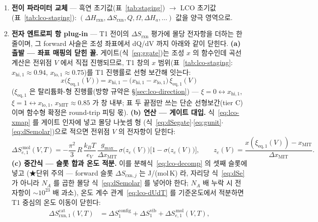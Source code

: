 \documentclass[11pt,a4paper]{article}
\newcommand{\eq}{\mathrm{eq}}
\newcommand{\rxn}{\mathrm{rxn}}
\begin{document}
\begin{enumerate}[label=(\roman*),leftmargin=2.2em,itemsep=1pt]
\item \textbf{전이 파라미터 교체} — 흑연 초기값(표~\ref{tab:staging}) $\to$ LCO 초기값(표~\ref{tab:lco-staging}):
$(\Delta H_\rxn,\Delta S_\rxn,Q,\Omega,\Delta H_a,\dots)$ 값을 양극 영역으로.
\item \textbf{전자 엔트로피 항 plug-in} — T1 전이의 $\Delta S_{\rxn}$ 평가에 몰당 전자항을 더하는 한 줄이며,
그 forward 사슬은 조성 좌표에서 dQ/dV 까지 아래와 같이 닫힌다.
\textbf{(a) 출발 — 좌표 매핑의 닫힌 꼴.} 게이트(식~\eqref{eq:ggate})는 조성 $x$ 의 함수인데 곡선 계산은
전위점 $V$ 에서 직접 진행되므로, T1 창의 $x$ 범위(표~\ref{tab:lco-staging}: $x_{\mathrm{hi},1}{\approx}0.94$,
$x_{\mathrm{lo},1}{\approx}0.75$)를 T1 진행률로 선형 보간해 잇는다:
\begin{equation}
x\big(\xi_{\eq,1}(V)\big)=x_{\mathrm{hi},1}-\big(x_{\mathrm{hi},1}-x_{\mathrm{lo},1}\big)\,\xi_{\eq,1}(V)
\label{eq:lco-xmap}
\end{equation}
($\xi_{\eq,1}$ 은 탈리튬화-형 진행률(방향 규약은 \S\ref{sec:lco-direction}) — $\xi{=}0\leftrightarrow x_{\mathrm{hi},1}$, $\xi{=}1\leftrightarrow x_{\mathrm{lo},1}$, $x_\mathrm{MIT}{\approx}0.85$ 가 창 내부; 표 두 끝점만 쓰는 단순 선형보간(tier C)이며 함수형 확정은 round-trip 피팅 몫).
\textbf{(b) 연산 — 게이트 대입.} 식~\eqref{eq:lco-xmap} 를 게이트 인자에 넣고 몰당 나눗셈 형
(식~\eqref{eq:dSegate}$\cdot$\eqref{eq:gunit}$\cdot$\eqref{eq:dSemolar})으로 적으면 전위점 $V$ 의
전자항이 닫힌다:
\begin{equation}
\Delta S_{e,1}^{\,\mathrm{mol}}(V,T)
=-\frac{\pi^2}{3}\,R\,\frac{k_BT}{e_V}\,\frac{g_{\max}}{\Delta x_\mathrm{MIT}}\,
\sigma\!\big(z_e(V)\big)\big[1-\sigma\!\big(z_e(V)\big)\big],
\qquad z_e(V)=\frac{x(\xi_{\eq,1}(V))-x_\mathrm{MIT}}{\Delta x_\mathrm{MIT}}.
\label{eq:lco-SeV}
\end{equation}
\textbf{(c) 중간식 — 슬롯 합과 온도 적분.} 이를 분해식~\eqref{eq:lco-decomp} 의 셋째 슬롯에 넣고
(★단위 주의 — forward 슬롯 $\Delta S_{\rxn,j}$ 는 J/(mol\,K) 라, 자리당 식~\eqref{eq:dSe} 가 아니라
$N_A$ 를 곱한 몰당 식~\eqref{eq:dSemolar} 를 넣어야 한다; $N_A$ 배 누락 시 전자항이 $\sim10^{23}$ 배
과소), 온도 계수 관계~\eqref{eq:lco-dUdT} 를 기준온도에서 적분하면 T1 중심의 온도 이동이 닫힌다:
\begin{equation}
\begin{aligned}
\Delta S_{\rxn,1}^\mathrm{cat}(V,T)&=\Delta S_1^\mathrm{config}+\Delta S_1^\mathrm{vib}
+\Delta S_{e,1}^{\,\mathrm{mol}}(V,T),\\

\end{aligned}
\end{equation}
\end{enumerate}
\end{document}
